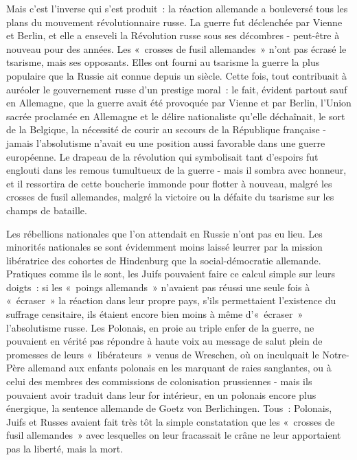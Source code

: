 \documentclass[french,twoside]{book} %
\begin{document}
Mais c’est l’inverse qui s’est produit : la réaction allemande a bouleversé tous les plans du mouvement révolutionnaire russe. La guerre fut déclenchée par Vienne et Berlin, et elle a enseveli la Révolution russe sous ses décombres - peut-être à nouveau pour des années. Les « crosses de fusil allemandes » n’ont pas écrasé le tsarisme, mais ses opposants. Elles ont fourni au tsarisme la guerre la plus populaire que la Russie ait connue depuis un siècle. Cette fois, tout contribuait à auréoler le gouvernement russe d’un prestige moral : le fait, évident partout sauf en Allemagne, que la guerre avait été provoquée par Vienne et par Berlin, l’Union sacrée proclamée en Allemagne et le délire nationaliste qu’elle déchaînait, le sort de la Belgique, la nécessité de courir au secours de la République française - jamais l’absolutisme n’avait eu une position aussi favorable dans une guerre européenne. Le drapeau de la révolution qui symbolisait tant d’espoirs fut englouti dans les remous tumultueux de la guerre - mais il sombra avec honneur, et il ressortira de cette boucherie immonde pour flotter à nouveau, malgré les crosses de fusil allemandes, malgré la victoire ou la défaite du tsarisme sur les champs de bataille.\par
  Les rébellions nationales que l’on attendait en Russie n’ont pas eu lieu. Les minorités nationales se sont évidemment moins laissé leurrer par la mission libératrice des cohortes de Hindenburg que la social-démocratie allemande. Pratiques comme ils le sont, les Juifs pouvaient faire ce calcul simple sur leurs doigts : si les « poings allemands » n’avaient pas réussi une seule fois à « écraser » la réaction dans leur propre pays, s’ils permettaient l’existence du suffrage censitaire, ils étaient encore bien moins à même d’« écraser » l’absolutisme russe. Les Polonais, en proie au triple enfer de la guerre, ne pouvaient en vérité pas répondre à haute voix au message de salut plein de promesses de leurs « libérateurs » venus de Wreschen, où on inculquait le Notre-Père allemand aux enfants polonais en les marquant de raies sanglantes, ou à celui des membres des commissions de colonisation prussiennes - mais ils pouvaient avoir traduit dans leur for intérieur, en un polonais encore plus énergique, la sentence allemande de Goetz von Berlichingen. Tous : Polonais, Juifs et Russes avaient fait très tôt la simple constatation que les « crosses de fusil allemandes » avec lesquelles on leur fracassait le crâne ne leur apportaient pas la liberté, mais la mort.\par
\end{document}
